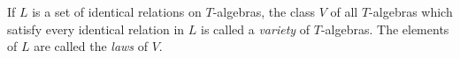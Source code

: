 If $L$ is a set of identical relations on $T$-algebras, the class $V$ of all $T$-algebras which satisfy every identical relation in $L$ is called a \emph{variety} of $T$-algebras. The elements of $L$ are called the \emph{laws} of $V$.
